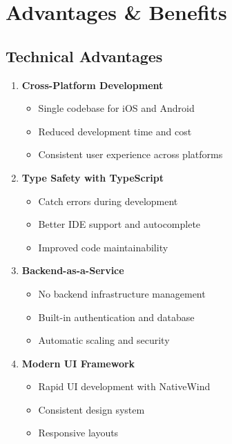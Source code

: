 \documentclass[11pt,a4paper,oneside]{book}
\begin{document}
\chapter{Advantages \& Benefits}

\section{Technical Advantages}

\begin{enumerate}
    \item \textbf{Cross-Platform Development}
    \begin{itemize}
        \item Single codebase for iOS and Android
        \item Reduced development time and cost
        \item Consistent user experience across platforms
    \end{itemize}
    
    \item \textbf{Type Safety with TypeScript}
    \begin{itemize}
        \item Catch errors during development
        \item Better IDE support and autocomplete
        \item Improved code maintainability
    \end{itemize}
    
    \item \textbf{Backend-as-a-Service}
    \begin{itemize}
        \item No backend infrastructure management
        \item Built-in authentication and database
        \item Automatic scaling and security
    \end{itemize}
    
    \item \textbf{Modern UI Framework}
    \begin{itemize}
        \item Rapid UI development with NativeWind
        \item Consistent design system
        \item Responsive layouts
    \end{itemize}
\end{enumerate}
\end{document}
